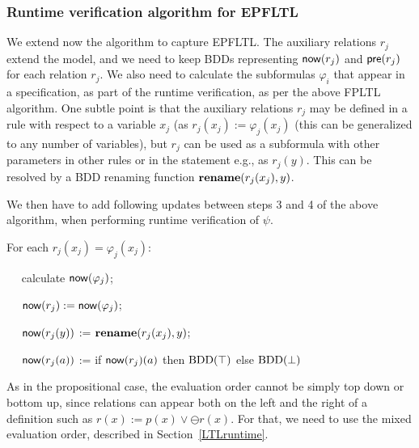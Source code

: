 \subsubsection{Runtime verification algorithm for EPFLTL}

We extend now the algorithm to capture EPFLTL.
The auxiliary relations $r_j$ extend the model, and we need to keep 
BDDs representing $\mathsf{now} ( r_j )$ and
$\mathsf{pre} (r_j)$ for each relation $r_j$. We also need to calculate the 
subformulas $\varphi_i$ that appear in
a specification, as part of the runtime verification,
as per the above FPLTL algorithm. One subtle point is that the auxiliary 
relations $r_j$ may be defined in a rule with respect to
a variable $x_j$ (as $r_j (x_j ):= \varphi_j (x_j)$ (this can be generalized 
to any number of variables), but $r_j$ can be used
as a subformula with other parameters in other rules or in the statement e.g., 
as $r_j ( y )$. This can be resolved by a BDD renaming function 
$\mathbf{rename} ( r_j (x_j ) , y)$.


We then have to add
following updates between steps 3 and 4 of the above algorithm, when performing runtime verification of
$\psi$. 

\noindent \begin{description}
\item For each $r_j ( x_j ) = \varphi_j ( x_j )$:
\item{\ \ }  calculate $\mathsf{now} ( \varphi_j )$;
\item{\ \ }  $\mathsf{now} ( r_j )  := \mathsf{now} (\varphi_j)$;
\item{\ \ } $\mathsf{now} ( r_j ( y ) )$ := $\mathbf{rename} ( r_j(x_j) ,  y )$;
\item{\ \ } $\mathsf{now} ( r_j ( a ) )$ := if $\mathsf{now} ( r_j ) ( a )$
then $\mathrm{BDD}(\top)$ else $\mathrm{BDD}(\bot)$
\end{description}


\noindent
As in the propositional case, the evaluation order cannot be
simply top down or bottom up, since relations can appear
both on the left and the right of a definition
such as $r ( x ) := p ( x ) \vee \ominus r ( x )$. For that,
we need to use the mixed evaluation order, described in Section~\ref{LTLruntime}.













